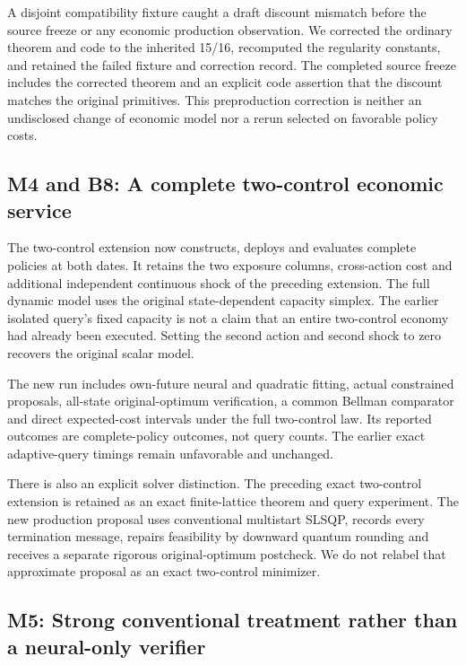 A disjoint compatibility fixture caught a draft discount mismatch before
the source freeze or any economic production observation. We corrected
the ordinary theorem and code to the inherited 15/16, recomputed the
regularity constants, and retained the failed fixture and correction
record. The completed source freeze includes the corrected theorem and
an explicit code assertion that the discount matches the original
primitives. This preproduction correction is neither an undisclosed
change of economic model nor a rerun selected on favorable policy costs.

\hypertarget{m4-and-b8-a-complete-two-control-economic-service}{%
\subsection{M4 and B8: A complete two-control economic
service}\label{m4-and-b8-a-complete-two-control-economic-service}}

The two-control extension now constructs, deploys and evaluates complete
policies at both dates. It retains the two exposure columns,
cross-action cost and additional independent continuous shock of the
preceding extension. The full dynamic model uses the original
state-dependent capacity simplex. The earlier isolated query's fixed
capacity is not a claim that an entire two-control economy had already
been executed. Setting the second action and second shock to zero
recovers the original scalar model.

The new run includes own-future neural and quadratic fitting, actual
constrained proposals, all-state original-optimum verification, a common
Bellman comparator and direct expected-cost intervals under the full
two-control law. Its reported outcomes are complete-policy outcomes, not
query counts. The earlier exact adaptive-query timings remain
unfavorable and unchanged.

There is also an explicit solver distinction. The preceding exact
two-control extension is retained as an exact finite-lattice theorem and
query experiment. The new production proposal uses conventional
multistart SLSQP, records every termination message, repairs feasibility
by downward quantum rounding and receives a separate rigorous
original-optimum postcheck. We do not relabel that approximate proposal
as an exact two-control minimizer.

\hypertarget{m5-strong-conventional-treatment-rather-than-a-neural-only-verifier}{%
\subsection{M5: Strong conventional treatment rather than a neural-only
verifier}\label{m5-strong-conventional-treatment-rather-than-a-neural-only-verifier}}

